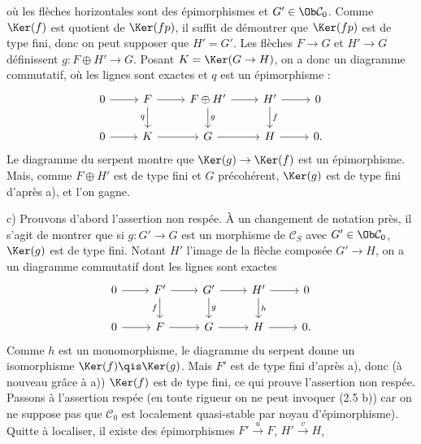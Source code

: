 où les
flèches horizontales sont des épimorphismes et \(G'\in\Ob\mathcal C_0\). Comme \(\Ker(f)\) est quotient de \(\Ker(fp)\), il suffit de démontrer que \(\Ker(fp)\) est de type fini, donc on peut supposer que \(H'=G'\). Les flèches \(F\to G\) et \(H'\to G\) définissent \(g:F\oplus H'\to G\). Posant \(K=\Ker(G\to H)\), on a donc un diagramme commutatif, où les lignes sont exactes et \(q\) est un épimorphisme :
\[
\begin{tikzcd}
0\arrow[r]&F\arrow[r]\arrow[d,"q"']&F\oplus H'\arrow[r]\arrow[d,"g"]&H'\arrow[r]\arrow[d,"f"]&0\\
0\arrow[r]&K\arrow[r]&G\arrow[r]&H\arrow[r]&0 .
\end{tikzcd}
\]
Le diagramme du serpent montre que \(\Ker(g)\to\Ker(f)\) est un épimorphisme. Mais, comme \(F\oplus H'\) est de type fini et \(G\) précohérent, \(\Ker(g)\) est de type fini d'après a), et l'on gagne.

c) Prouvons d'abord l'assertion non respée. À un changement de notation près, il s'agit de montrer que si \(g:G'\to G\) est un morphisme de \(\mathcal C_S\) avec \(G'\in\Ob\mathcal C_0\), \(\Ker(g)\) est de type fini. Notant \(H'\) l'image de la flèche composée \(G'\to H\), on a un diagramme commutatif dont les lignes sont exactes
\[
\begin{tikzcd}
0\arrow[r]&F'\arrow[r]\arrow[d,"f"']&G'\arrow[r]\arrow[d,"g"]&H'\arrow[r]\arrow[d,"h"]&0\\
0\arrow[r]&F\arrow[r]&G\arrow[r]&H\arrow[r]&0 .
\end{tikzcd}
\]
Comme \(h\) est un monomorphisme, le diagramme du serpent donne un isomorphisme \(\Ker(f)\qis\Ker(g)\). Mais \(F'\) est de type fini d'après a), donc (à nouveau grâce à a)) \(\Ker(f)\) est de type fini, ce qui prouve l'assertion non respée. Passons à l'assertion respée (en toute rigueur on ne peut invoquer (2.5 b)) car on ne suppose pas que \(\mathcal C_0\) est localement quasi-stable par noyau d'épimorphisme). Quitte à localiser, il existe des épimorphismes \(F'\xrightarrow{u}F\), \(H'\xrightarrow{v}H\),
